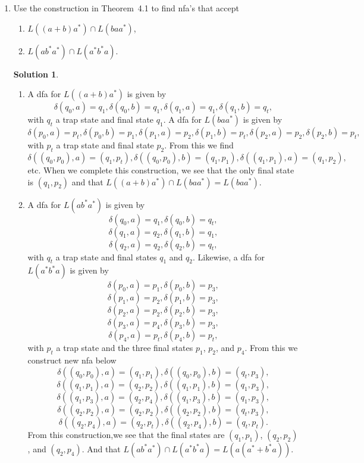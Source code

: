 \documentclass[]{book}
\theoremstyle{definition}
\newtheorem*{soln}{Solution}
\begin{document}
\begin{enumerate}
\item
    Use the construction in Theorem~4.1 to find nfa's that accept
    \begin{enumerate}
        \item $L((a + b )a^\ast) \cap L(baa^\ast)$,
        \item $L(ab^\ast a^\ast) \cap L(a^\ast b^\ast a)$.
    \end{enumerate}
\begin{soln}
    \begin{enumerate}
        \item A dfa for $L((a + b)a^\ast)$ is given by
                $$\delta(q_0, a) = q_1, \delta(q_0, b) = q_1, \delta(q_1, a) = q_1,
                \delta(q_1, b) = q_t,$$
            with $q_t$ a trap state and final state $q_1$. A dfa for $L(baa^\ast)$ is given by
                $$\delta(p_0, a) = p_t, \delta(p_0, b) = p_1, \delta(p_1, a) = p_2,
                \delta(p_1, b) = p_t, \delta(p_2, a) = p_2, \delta(p_2, b) = p_t,$$
            with $p_t$ a trap state and final state $p_2$. From this we find
                $$\delta((q_0, p_0), a) = (q_1, p_t), \delta((q_0, p_0), b) = (q_1, p_1),
                \delta((q_1, p_1), a) = (q_1, p_2),$$
            etc. When we complete this construction, we see that the only final state is
            $(q_1, p_2)$ and that $L((a + b)a^\ast) \cap L(baa^\ast) = L(baa^\ast)$.
        \item A dfa for $L(ab^\ast a^\ast)$ is given by
                $$\delta(q_0, a) = q_1, \delta(q_0, b) = q_t,$$
                $$\delta(q_1, a) = q_2, \delta(q_1, b) = q_1,$$
                $$\delta(q_2, a) = q_2, \delta(q_2, b) = q_t,$$
            with $q_t$ a trap state and final states $q_1$ and $q_2$. Likewise, a dfa for
            $L(a^\ast b^\ast a)$ is given by
                $$\delta(p_0, a) = p_1, \delta(p_0, b) = p_3,$$
                $$\delta(p_1, a) = p_2, \delta(p_1, b) = p_3,$$
                $$\delta(p_2, a) = p_2, \delta(p_2, b) = p_3,$$
                $$\delta(p_3, a) = p_4, \delta(p_3, b) = p_3,$$
                $$\delta(p_4, a) = p_t, \delta(p_4, b) = p_t,$$
            with $p_t$ a trap state and the three final states $p_1$, $p_2$, and $p_4$.
            From this we construct new nfa below
                $$\delta((q_0, p_0), a) = (q_1, p_1), \delta((q_0, p_0), b) = (q_t, p_3),$$
                $$\delta((q_1, p_1), a) = (q_2, p_2), \delta((q_1, p_1), b) = (q_1, p_3),$$
                $$\delta((q_1, p_3), a) = (q_2, p_4), \delta((q_1, p_3), b) = (q_1, p_3),$$
                $$\delta((q_2, p_2), a) = (q_2, p_2), \delta((q_2, p_2), b) = (q_t, p_3),$$
                $$\delta((q_2, p_4), a) = (q_2, p_t), \delta((q_2, p_4), b) = (q_t, p_t).$$
            From this construction,we see that the final states are
            $(q_1, p_1)$, $(q_2, p_2)$, and $(q_2, p_4)$.
            And that $L(ab^\ast a^\ast) \cap L(a^\ast b^\ast a) = L(a(a^\ast + b^\ast a))$.
    \end{enumerate}
\end{soln}


\end{enumerate}
\end{document}
